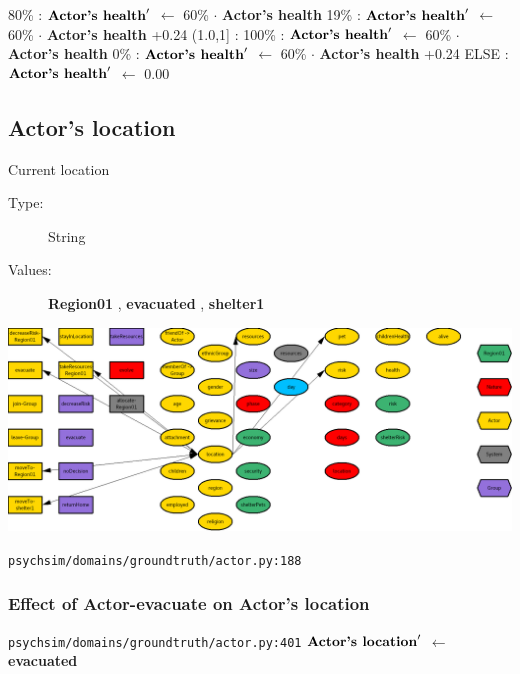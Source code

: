 \documentclass{article}%
\begin{document}
\begin{flushleft}
\hspace*{6em}%
80\%%
: %
$\mbox{\textbf{Actor's health}} '$%
$\leftarrow$%
60\%%
$\cdot$%
\textbf{Actor's health}%
\linebreak%
\hspace*{6em}%
19\%%
: %
$\mbox{\textbf{Actor's health}} '$%
$\leftarrow$%
60\%%
$\cdot$%
\textbf{Actor's health}%
+0.24%
\linebreak%
\hspace*{4em}%
(1.0,1{]}%
: %
\linebreak%
\hspace*{6em}%
100\%%
: %
$\mbox{\textbf{Actor's health}} '$%
$\leftarrow$%
60\%%
$\cdot$%
\textbf{Actor's health}%
\linebreak%
\hspace*{6em}%
0\%%
: %
$\mbox{\textbf{Actor's health}} '$%
$\leftarrow$%
60\%%
$\cdot$%
\textbf{Actor's health}%
+0.24%
\linebreak%
\hspace*{2em}%
ELSE %
: %
$\mbox{\textbf{Actor's health}} '$%
$\leftarrow$%
0.00%
\end{flushleft}

%
\subsection{Actor's location}%
\label{subsec:Actor's location}%
Current location%
\begin{description}%
\item[Type:]%
String%
\item[Values:]%
\textbf{Region01}%
, %
\textbf{evacuated}%
, %
\textbf{shelter1}%
\end{description}%
\includegraphics[width=\textwidth]{images/locationOfActor.png}%
\begin{flushleft}%
\verb|psychsim/domains/groundtruth/actor.py:188|%
\end{flushleft}%
\subsubsection{Effect of Actor{-}evacuate on Actor's location}%
\label{ssubsec:Effect of Actor{-}evacuate on Actor's location}%
\begin{flushleft}%
\verb|psychsim/domains/groundtruth/actor.py:401|%
\linebreak%
$\mbox{\textbf{Actor's location}} '$%
$\leftarrow$%
\textbf{evacuated}%
\end{flushleft}
\end{document}
